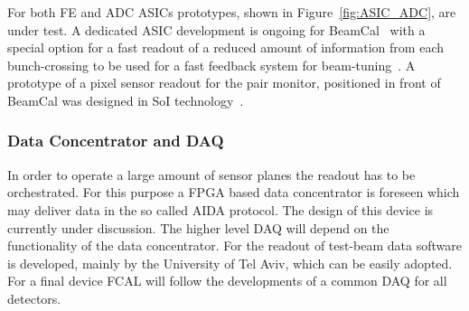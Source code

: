 For both FE and ADC ASICs prototypes, shown in Figure~\ref{fig:ASIC_ADC}, are under test.
A dedicated ASIC development is ongoing for BeamCal~\cite{6200898}
with a special option for a fast readout of a reduced amount of
information from each bunch-crossing to be used for a fast feedback system for beam-tuning~\cite{1748-0221-3-10-P10004}.
A prototype of a pixel sensor readout for the pair monitor, positioned in front of BeamCal was designed in SoI
technology~\cite{Sato201153}.


\subsubsection{Data Concentrator and DAQ}
In order to operate a large amount of sensor planes the readout has to be orchestrated.
For this purpose a FPGA based data concentrator is foreseen
which may deliver data in the so called AIDA protocol. The design of this device is currently under discussion.
The higher level DAQ will depend on the functionality of the data concentrator.
For the readout of test-beam data  software is developed, mainly by the University of Tel Aviv,
which can be easily adopted.
For a final device FCAL will follow the developments of a common DAQ for all detectors.
